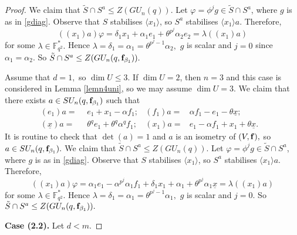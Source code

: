 \begin{proof}
We claim that $\tilde{S} \cap S^a \le Z(GU_n(q)).$ Let $\varphi= \phi^jg \in \tilde{S} \cap S^a$, where $g$ is as in \eqref{gdiag}. Observe that $S$ stabilises  $\langle x_1\rangle$, so $S^a$ stabilises $\langle x_1\rangle a.$ Therefore, 
\begin{equation*}
((x_1)a)\varphi= \delta_1 x_1 + \alpha_1 e_1 + \theta^{p^j} \alpha_2 e_2= \lambda ((x_1)a) 
\end{equation*}
 for some $\lambda \in \mathbb{F}_{q^2}^*.$ Hence $\lambda= \delta_1 =\alpha_1 = \theta^{p^j-1} \alpha_2,$
$g$ is scalar and $j=0$ since $\alpha_1=\alpha_2.$ So $\tilde{S} \cap S^a\le Z(GU_n(q,{\bf f}_{\beta_1})).$

Assume that $d=1,$ so $\dim U \le 3$. If $\dim U=2$, then $n=3$ and this case is considered in Lemma \ref{lemn4uni}, so we may assume $\dim U=3.$ We claim that there exists  $a \in SU_n(q, {\bf f}_{\beta_1})$ such that 
\begin{align*}
(e_1)a= &\phantom{(}  e_1+x_1 - \alpha f_1; & (f_1)a= & \alpha f_1  - e_1 - \theta \underline{x}; & \\
(\underline{x})a=  & \phantom{(} \theta^q e_{1} + \theta^q \alpha^q f_1; & (x_1)a= & e_1- \alpha f_{1}+ x_1 +\theta \underline{x}. & 
\end{align*}
   It is routine to check that $\det(a)=1$ and $a$ is an isometry of $(V, {\bf f}),$ so $a \in SU_n(q,{\bf f}_{\beta_1}).$ We claim that $\tilde{S} \cap S^a \le Z(GU_n(q)).$ Let $\varphi= \phi^jg \in \tilde{S} \cap S^a$, where $g$ is as in \eqref{gdiag}. Observe that $S$ stabilises  $\langle x_1\rangle$, so $S^a$ stabilises $\langle x_1\rangle a.$ Therefore, 
\begin{equation*}
((x_1)a)\varphi= \alpha_1 e_1 - \alpha^{p^j} \alpha_1 f_1+ \delta_1 x_1 + \alpha_1  + \theta^{p^j} \alpha_1 \underline{x} = \lambda ((x_1)a) 
\end{equation*}
 for some $\lambda \in \mathbb{F}_{q^2}^*.$ Hence $\lambda= \delta_1 =\alpha_1 = \theta^{p^j-1} \alpha_1,$
$g$ is scalar and $j=0$. So $\tilde{S} \cap S^a\le Z(GU_n(q,{\bf f}_{\beta_1})).$

\medskip

{\bf Case (2.2).} Let $d<m.$


\end{proof}
